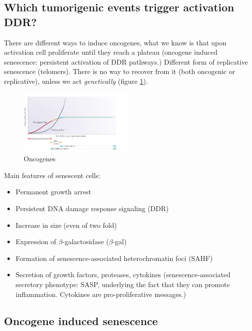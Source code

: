 \hypertarget{which-tumorigenic-events-trigger-activation-ddr-very-early-in-tumorigenesis}{%
\subsection{Which tumorigenic events trigger activation DDR?}\label{which-tumorigenic-events-trigger-activation-ddr-very-early-in-tumorigenesis}}

There are different ways to induce oncogenes, what we know is that upon activation cell proliferate until they reach a plateau (oncogene
induced senescence: persistent activation of DDR pathways.) 
Different form of replicative senescence (telomers). There is no way to recover from it (both oncogenic or replicative), unless we act \emph{genetically} (figure \ref{fig:activation}).

\begin{figure}[h!]
\centering
\includegraphics[width=0.5\textwidth]{../_resources/e5bec01cb6c2d9a42b67721810b931fb.png}
\caption{Oncogenes}
\label{fig:activation}
\end{figure}

Main features of senescent cells: 
\begin{itemize}
\tightlist
\item Permanent growth arrest 
\item Persistent DNA damage response signaling (DDR) 
\item Increase in size (even of two
fold)
\item Expression of $\beta$-galactosidase ($\beta$-gal) 
\item Formation of
senescence-associated heterochromatin foci (SAHF) 
\item Secretion of growth factors, proteases, cytokines (senescence-associated secretory phenotype: SASP, underlying the fact that they can promote inflammation. Cytokines are pro-proliferative messages.)
\end{itemize}

\hypertarget{oncogene-induced-senescence-cells}{%
\subsection{Oncogene induced senescence}\label{oncogene-induced-senescence-cells}}

